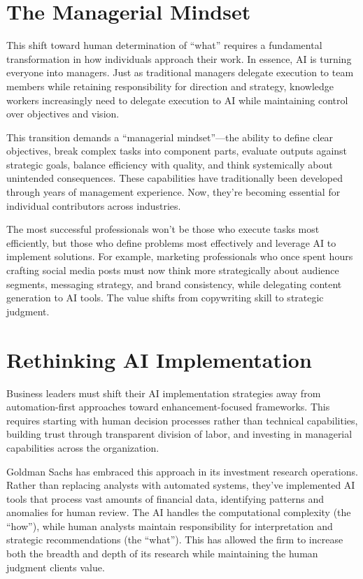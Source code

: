 \documentclass[
  Letterpaper,
]{scrbook}
\begin{document}
\section{\texorpdfstring{The Managerial
Mindset}{The Managerial Mindset}}\label{the-managerial-mindset}

This shift toward human determination of ``what'' requires a fundamental
transformation in how individuals approach their work. In essence, AI is
turning everyone into managers. Just as traditional managers delegate
execution to team members while retaining responsibility for direction
and strategy, knowledge workers increasingly need to delegate execution
to AI while maintaining control over objectives and vision.

This transition demands a ``managerial mindset''---the ability to define
clear objectives, break complex tasks into component parts, evaluate
outputs against strategic goals, balance efficiency with quality, and
think systemically about unintended consequences. These capabilities
have traditionally been developed through years of management
experience. Now, they're becoming essential for individual contributors
across industries.

The most successful professionals won't be those who execute tasks most
efficiently, but those who define problems most effectively and leverage
AI to implement solutions. For example, marketing
professionals who once spent hours crafting social media posts must now
think more strategically about audience segments, messaging strategy,
and brand consistency, while delegating content generation to AI tools.
The value shifts from copywriting skill to strategic judgment.

\section{Rethinking AI
Implementation}\label{rethinking-ai-implementation}

Business leaders must shift their AI implementation strategies away from
automation-first approaches toward
enhancement-focused frameworks.
This requires starting with human decision processes rather than
technical capabilities, building trust through transparent division of
labor, and investing in managerial capabilities across the organization.

Goldman Sachs has embraced this
approach in its investment research operations. Rather than replacing
analysts with automated systems, they've implemented AI tools that
process vast amounts of financial data, identifying patterns and
anomalies for human review. The AI handles the computational complexity
(the ``how''), while human analysts maintain responsibility for
interpretation and strategic recommendations (the ``what''). This has
allowed the firm to increase both the breadth and depth of its research
while maintaining the human judgment clients value.
\end{document}
